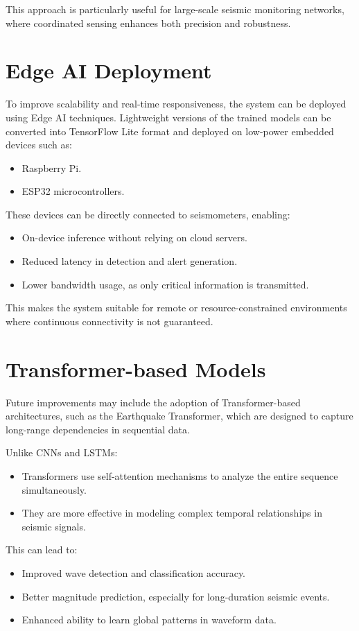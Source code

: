 \documentclass[a4paper,12pt]{report}
\begin{document}
This approach is particularly useful for large-scale seismic monitoring networks, where coordinated sensing enhances both precision and robustness.

\section{Edge AI Deployment}
\label{sec:5.2}

To improve scalability and real-time responsiveness, the system can be deployed using Edge AI techniques. Lightweight versions of the trained models can be converted into TensorFlow Lite format and deployed on low-power embedded devices such as:
\begin{itemize}
\item Raspberry Pi.
\item ESP32 microcontrollers.
\end{itemize}

These devices can be directly connected to seismometers, enabling:
\begin{itemize}
\item On-device inference without relying on cloud servers.
\item Reduced latency in detection and alert generation.
\item Lower bandwidth usage, as only critical information is transmitted.
\end{itemize}

This makes the system suitable for remote or resource-constrained environments where continuous connectivity is not guaranteed.

\section{Transformer-based Models}
\label{sec:5.3}

Future improvements may include the adoption of Transformer-based architectures, such as the Earthquake Transformer, which are designed to capture long-range dependencies in sequential data.

Unlike CNNs and LSTMs:
\begin{itemize}
\item Transformers use self-attention mechanisms to analyze the entire sequence simultaneously.
\item They are more effective in modeling complex temporal relationships in seismic signals.
\end{itemize}

This can lead to:
\begin{itemize}
\item Improved wave detection and classification accuracy.
\item Better magnitude prediction, especially for long-duration seismic events.
\item Enhanced ability to learn global patterns in waveform data.
\end{itemize}
\end{document}
